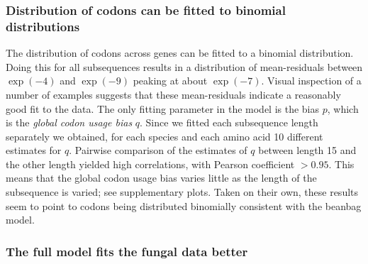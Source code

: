 \documentclass[a4paper,10pt]{paper}%
\begin{document}
\subsubsection{Distribution of codons can be fitted to  binomial distributions}

The distribution of codons across genes can be fitted  to  a binomial distribution. Doing this for all subsequences results in a distribution of   mean-residuals between $\exp(-4)$ and $\exp(-9)$ peaking at about $\exp(-7)$. Visual inspection of a number of examples suggests that these mean-residuals indicate  a reasonably good fit to the data. The only fitting parameter in the model is the  bias $p$, which  is  the {\em global  codon usage bias} $q$.  Since we fitted each subsequence length separately we obtained, for each species and each amino acid 10 different estimates for   $q$.  Pairwise comparison of the estimates  of $q$ between length 15 and the other length yielded  high correlations, with Pearson coefficient $> 0.95$. This means that the global codon usage bias varies little as the length of the subsequence is varied; see supplementary plots.  Taken on their own, these results seem to point to codons being distributed binomially consistent with the beanbag model.


\subsubsection{The full model fits the fungal data better}
\end{document}

